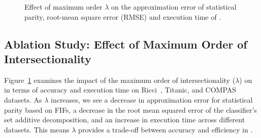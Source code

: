 \begin{figure}
	
	
	\caption[Ablation study on FIFs: $ \lambda $]{Effect of maximum order $ \lambda $ on the approximation error of statistical parity, root-mean square error (RMSE) and  execution time of {\fairXplainer}.}
	\label{fairness_fairXplainer_fig:effect_maxorder_appendix}
\end{figure}




\subsection{Ablation Study: Effect of Maximum Order of Intersectionality}\label{fairness_fairXplainer_sec:ablation} 
Figure~\ref{fairness_fairXplainer_fig:effect_maxorder_appendix} examines the impact of the maximum order of intersectionality ($\lambda$) on {\fairXplainer} in terms of accuracy and execution time on Ricci~\cite{mcginley2010ricci}, Titanic, and COMPAS datasets. As $\lambda$ increases, we see a decrease in approximation error for statistical parity based on FIFs, a decrease in the root mean squared error of the classifier's set additive decomposition, and an increase in execution time across different datasets. This means $\lambda$ provides a trade-off between accuracy and efficiency in {\fairXplainer}.


